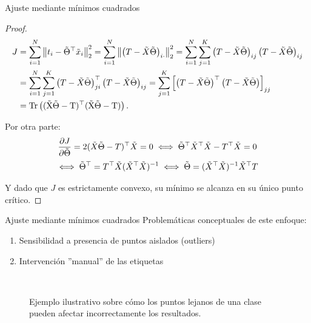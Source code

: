 \documentclass[9pt]{beamer}
\begin{document}
\begin{frame}{Ajuste mediante mínimos cuadrados}

\begin{proof}
\begin{align*}
  J &= \sum_{i=1}^N \norm{t_i - \tilde{\Theta}^\top\tx_i}_2^2 = \sum_{i=1}^N \norm{\left(T - \tX\tilde{\Theta}\right)_{i\cdot}}_2^2 = \sum_{i=1}^N \sum_{j=1}^K \left(T - \tX\tilde{\Theta}\right)_{ij} \left(T - \tX\tilde{\Theta}\right)_{ij}\\
  &= \sum_{i=1}^N \sum_{j=1}^K \left(T - \tX\tilde{\Theta}\right)^\top_{ji} \left(T - \tX\tilde{\Theta}\right)_{ij} =  \sum_{j=1}^K \left[\left(T - \tX\tilde{\Theta}\right)^\top \left(T - \tX\tilde{\Theta}\right)\right]_{jj}\\
  &=\operatorfont{Tr} \left((\tX\tilde{\Theta}-T)^\top (\tX\tilde{\Theta}-T)\right).
\end{align*}
  
Por otra parte:
\begin{equation*}
  \frac{\partial J}{\partial\tilde{\Theta}} = 2(\tilde{X}\tilde{\Theta}-T)^\top\tilde{X}=0 \iff \tilde{\Theta}^\top\tilde{X}^\top\tilde{X} - T^\top\tilde{X} = 0 
\end{equation*}
\begin{equation*}
\iff \tilde{\Theta}^\top = T^\top\tilde{X}(\tilde{X}^\top\tilde{X})^{-1}\iff \tilde{\Theta} = (\tilde{X}^\top\tilde{X})^{-1}\tilde{X}^\top T
\end{equation*}
  
Y dado que $J$ es estrictamente convexo, su mínimo se alcanza en su único punto crítico.  

\end{proof}


\end{frame}

\begin{frame}{Ajuste mediante mínimos cuadrados}
Problemáticas conceptuales de este enfoque: 
\begin{enumerate}
  \item Sensibilidad a presencia de puntos aislados (outliers) \pause
  \item Intervención ''manual'' de las etiquetas \pause
\end{enumerate}
\begin{figure}[H]
  \centering
  \\
  \caption{Ejemplo ilustrativo sobre cómo los puntos lejanos de una clase pueden afectar incorrectamente los resultados.}
  \label{fig:clasif_mse}
\end{figure}


\end{frame}



%
\end{document}
